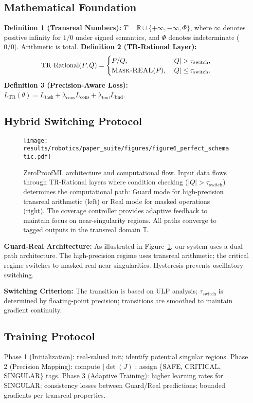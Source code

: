 \documentclass[twoside,11pt]{article}
\newcommand{\TR}{\mathbb{T}}
\newcommand{\RR}{\mathbb{R}}
\newcommand{\maskreal}{\textsc{Mask-REAL}}
\newcommand{\condswitch}{\mbox{$|Q|\!>\!\tau_{\mathrm{switch}}$}}
\begin{document}
\subsection{Mathematical Foundation}
\textbf{Definition 1 (Transreal Numbers):} $T = \RR \cup \{+\infty, -\infty, \Phi\}$, where $\infty$ denotes positive infinity for $1/0$ under signed semantics, and $\Phi$ denotes indeterminate ($0/0$). Arithmetic is total.
\newline
\textbf{Definition 2 (TR-Rational Layer):}
\[\mathrm{TR\text{-}Rational}(P,Q)=
\begin{cases}
P/Q, & |Q|>\tau_{\mathrm{switch}},\\
\maskreal(P), & |Q|\le \tau_{\mathrm{switch}}.
\end{cases}\]
\textbf{Definition 3 (Precision-Aware Loss):} $L_{\mathrm{TR}}(\theta)=L_{\mathrm{task}}+\lambda_{\mathrm{cons}}L_{\mathrm{cons}}+\lambda_{\mathrm{bnd}}L_{\mathrm{bnd}}$.
\subsection{Hybrid Switching Protocol}

\begin{figure}[t]
\centering
\texttt{[image: results/robotics/paper\_suite/figures/figure6\_perfect\_schematic.pdf]}
\caption{ZeroProofML architecture and computational flow. Input data flows through TR-Rational layers where condition checking (\condswitch) determines the computational path: Guard mode for high-precision transreal arithmetic (left) or Real mode for masked operations (right). The coverage controller provides adaptive feedback to maintain focus on near-singularity regions. All paths converge to tagged outputs in the transreal domain $\TR$.}
\label{fig:zeroproofml_schematic}
\end{figure}

\textbf{Guard-Real Architecture:} As illustrated in Figure~\ref{fig:zeroproofml_schematic}, our system uses a dual-path architecture. The high-precision regime uses transreal arithmetic; the critical regime switches to masked-real near singularities. Hysteresis prevents oscillatory switching. 

\textbf{Switching Criterion:} The transition is based on ULP analysis; $\tau_{\mathrm{switch}}$ is determined by floating-point precision; transitions are smoothed to maintain gradient continuity.
\subsection{Training Protocol}
Phase 1 (Initialization): real-valued init; identify potential singular regions.
Phase 2 (Precision Mapping): compute $|\det(J)|$; assign \{SAFE, CRITICAL, SINGULAR\} tags.
Phase 3 (Adaptive Training): higher learning rates for SINGULAR; consistency losses between Guard/Real predictions; bounded gradients per transreal properties.
\end{document}
